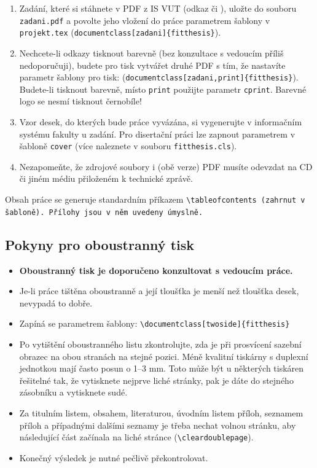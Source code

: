 \begin{enumerate}
  \item Zadání, které si stáhnete v PDF z IS VUT (odkaz  či ), uložte do souboru \texttt{zadani.pdf} a povolte jeho vložení do práce parametrem šablony v \texttt{projekt.tex} (\verb|document|\verb|class[zadani]{fitthesis}|).
  \item Nechcete-li odkazy tisknout barevně (bez konzultace s vedoucím příliš nedoporučuji), budete pro tisk vytvářet druhé PDF s tím, že nastavíte parametr šablony pro tisk: (\verb|document|\verb|class[zadani,print]{fitthesis}|). Budete-li tisknout barevně, místo \texttt{print} použijte parametr \texttt{cprint}. Barevné logo se nesmí tisknout černobíle!
  \item Vzor desek, do kterých bude práce vyvázána, si vygenerujte v informačním systému fakulty u zadání. Pro disertační práci lze zapnout parametrem v šabloně \texttt{cover} (více naleznete v souboru \texttt{fitthesis.cls}).
  \item Nezapomeňte, že zdrojové soubory i (obě verze) PDF musíte odevzdat na CD či jiném médiu přiloženém k technické zprávě.
\end{enumerate}

Obsah práce se generuje standardním příkazem \tt \textbackslash tableofcontents \rm (zahrnut v šabloně). Přílohy jsou v něm uvedeny úmyslně.

\subsection*{Pokyny pro oboustranný tisk}
\begin{itemize}
\item \textbf{Oboustranný tisk je doporučeno konzultovat s vedoucím práce.}
\item Je-li práce tištěna oboustranně a její tloušťka je menší než tloušťka desek, nevypadá to dobře.
\item Zapíná se parametrem šablony: \verb|\document|\verb|class[twoside]{fitthesis}|
\item Po vytištění oboustranného listu zkontrolujte, zda je při prosvícení sazební obrazec na obou stranách na stejné pozici. Méně kvalitní tiskárny s duplexní jednotkou mají často posun o 1--3 mm. Toto může být u některých tiskáren řešitelné tak, že vytisknete nejprve liché stránky, pak je dáte do stejného zásobníku a vytisknete sudé.
\item Za titulním listem, obsahem, literaturou, úvodním listem příloh, seznamem příloh a případnými dalšími seznamy je třeba nechat volnou stránku, aby následující část začínala na liché stránce (\texttt{\textbackslash cleardoublepage}).
\item  Konečný výsledek je nutné pečlivě překontrolovat.
\end{itemize}

